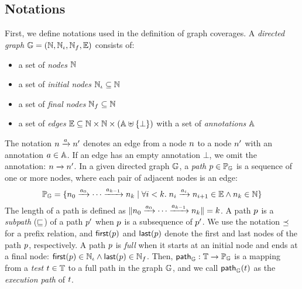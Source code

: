 \subsection{Notations}
%
First, we define notations used in the definition of graph coverages.
%
A \textit{directed graph} $\mathbb{G} = (\mathbb{N}, \mathbb{N}_\iota,
\mathbb{N}_f, \mathbb{E})$ consists of:
\begin{itemize}
  \item a set of \textit{nodes} $\mathbb{N}$
  \item a set of \textit{initial nodes} $\mathbb{N}_\iota \subseteq \mathbb{N}$
  \item a set of \textit{final nodes} $\mathbb{N}_f \subseteq \mathbb{N}$
  \item a set of \textit{edges} $\mathbb{E} \subseteq \mathbb{N} \times \mathbb{N}
    \times (\mathbb{A} \uplus \{ \bot \})$ with a set of \textit{annotations}
    $\mathbb{A}$
\end{itemize}
%
The notation $n \xrightarrow{a} n'$ denotes an edge from a node $n$ to
a node $n'$ with an annotation $a \in \mathbb{A}$.
%
If an edge has an empty annotation $\bot$, we omit the annotation: $n
\xrightarrow{} n'$.
%
In a given directed graph $\mathbb{G}$, a \textit{path} $p \in \mathbb{P}_{\mathbb{G}}$
is a sequence of one or more nodes, where each pair of adjacent nodes is an
edge:
\begin{equation}\label{euq:path-def}
  \mathbb{P}_{\mathbb{G}} = \{
    n_0 \xrightarrow{a_0} \cdots \xrightarrow{a_{k-1}} n_k \mid
    \forall i < k. \; n_i \xrightarrow{a_i} n_{i+1} \in \mathbb{E} \wedge
    n_k \in \mathbb{N}
  \}
\end{equation}
%
The length of a path is defined as $\lVert{n_0 \xrightarrow{a_0} \cdots
\xrightarrow{a_{k-1}} n_k}\rVert = k$.
%
A path $p$ is a \textit{subpath} ($\sqsubseteq$) of a path $p'$ when $p$
is a subsequence of $p'$.
%
We use the notation $\preceq$ for a prefix relation, and $\textsf{first}(p)$ and
$\textsf{last}(p)$ denote the first and last nodes of the path $p$,
respectively.
%
A path $p$ is \textit{full} when it starts at an initial node and ends at a
final node: $\textsf{first}(p) \in \mathbb{N}_\iota \wedge \textsf{last}(p) \in \mathbb{N}_f$.
%
Then, $\textsf{path}_{\mathbb{G}} : \mathbb{T} \rightarrow \mathbb{P}_{\mathbb{G}}$ is a mapping from
a \textit{test} $t \in \mathbb{T}$ to a full path in the graph $\mathbb{G}$, and
we call $\textsf{path}_{\mathbb{G}}(t)$ as the \textit{execution path} of $t$.


